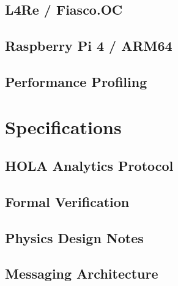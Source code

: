 \chapter{L4Re / Fiasco.OC}





\chapter{Raspberry Pi 4 / ARM64}



\chapter{Performance Profiling}




\part{Specifications}

\chapter{HOLA Analytics Protocol}


\chapter{Formal Verification}


\appendix

\chapter{Physics Design Notes}




\chapter{Messaging Architecture}


\backmatter




